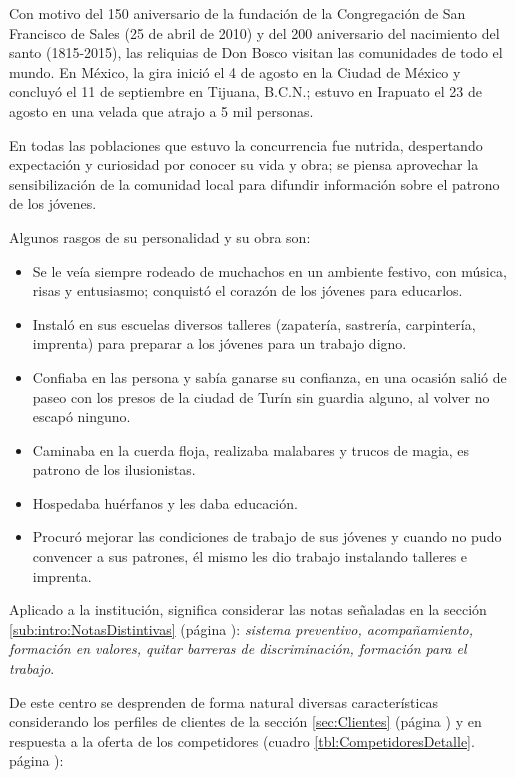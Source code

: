 Con motivo del 150 aniversario de la fundación de la Congregación de San Francisco de Sales (25 de abril de 2010) y del 200 aniversario del nacimiento del santo (1815-2015), las reliquias de Don Bosco visitan las comunidades de todo el mundo. En México, la gira inició el 4 de agosto en la Ciudad de México y concluyó el 11 de septiembre en Tijuana, B.C.N.; estuvo en Irapuato el 23 de agosto en una velada que atrajo a 5 mil personas.

En todas las poblaciones que estuvo la concurrencia fue nutrida, despertando expectación y curiosidad por conocer su vida y obra; se piensa aprovechar la sensibilización de la comunidad local para difundir información sobre el patrono de los jóvenes.

Algunos rasgos de su personalidad y su obra son:

\begin{itemize}
	\item Se le veía siempre rodeado de muchachos en un ambiente festivo, con música, risas y entusiasmo; conquistó el corazón de los jóvenes para educarlos.
	\item Instaló en sus escuelas diversos talleres (zapatería, sastrería, carpintería, imprenta) para preparar a los jóvenes para un trabajo digno.
	\item Confiaba en las persona y sabía ganarse su confianza, en una ocasión salió de paseo con los presos de la ciudad de Turín sin guardia alguno, al volver no escapó ninguno.
	\item Caminaba en la cuerda floja, realizaba malabares y trucos de magia, es patrono de los ilusionistas.
	\item Hospedaba huérfanos y les daba educación.
	\item Procuró mejorar las condiciones de trabajo de sus jóvenes y cuando no pudo convencer a sus patrones, él mismo les dio trabajo instalando talleres e imprenta.
\end{itemize}

Aplicado a la institución, significa considerar las notas señaladas en la sección \ref{sub:intro:NotasDistintivas} (página \pageref{sub:intro:NotasDistintivas}): \emph{sistema preventivo, acompañamiento, formación en valores, quitar barreras de discriminación, formación para el trabajo}.

De este centro se desprenden de forma natural diversas características considerando los perfiles de clientes de la sección \ref{sec:Clientes} (página \pageref{sec:Clientes}) y en respuesta a la oferta de los competidores (cuadro \ref{tbl:CompetidoresDetalle}. p\'agina \pageref{tbl:CompetidoresDetalle}):

